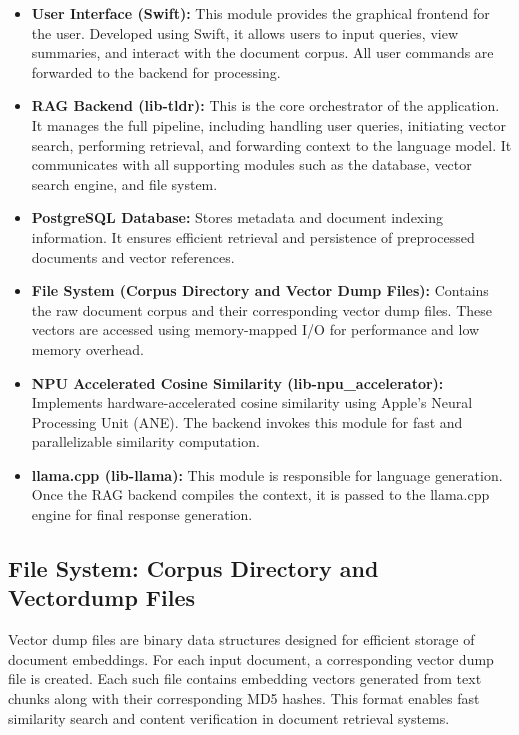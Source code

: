 \begin{itemize}
    \item \textbf{User Interface (Swift):} This module provides the graphical frontend for the user. Developed using Swift, it allows users to input queries, view summaries, and interact with the document corpus. All user commands are forwarded to the backend for processing.

    \item \textbf{RAG Backend (lib-tldr):} This is the core orchestrator of the application. It manages the full pipeline, including handling user queries, initiating vector search, performing retrieval, and forwarding context to the language model. It communicates with all supporting modules such as the database, vector search engine, and file system.

    \item \textbf{PostgreSQL Database:} Stores metadata and document indexing information. It ensures efficient retrieval and persistence of preprocessed documents and vector references.

    \item \textbf{File System (Corpus Directory and Vector Dump Files):} Contains the raw document corpus and their corresponding vector dump files. These vectors are accessed using memory-mapped I/O for performance and low memory overhead.


    \item \textbf{NPU Accelerated Cosine Similarity (lib-npu\_accelerator):} Implements hardware-accelerated cosine similarity using Apple's Neural Processing Unit (ANE). The backend invokes this module for fast and parallelizable similarity computation.

    \item \textbf{llama.cpp (lib-llama):} This module is responsible for language generation. Once the RAG backend compiles the context, it is passed to the llama.cpp engine for final response generation.
\end{itemize}


\subsection{File System: Corpus Directory and Vectordump Files}
\label{subsec:FSandVectordump_files}
Vector dump files are binary data structures designed for efficient storage of document embeddings. For each input document, a corresponding vector dump file is created. Each such file contains embedding vectors generated from text chunks along with their corresponding MD5 hashes. This format enables fast similarity search and content verification in document retrieval systems.

